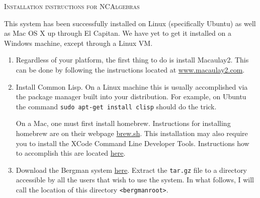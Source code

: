 \documentclass{article}
\newcommand{\bergroot}{\texttt{<bergmanroot>}}
\begin{document}
\begin{center}
\textsc{Installation instructions for NCAlgebras}
\end{center}

This system has been successfully installed on Linux (specifically Ubuntu)
as well as Mac OS X up through El Capitan.  We have yet to get it installed
on a Windows machine, except through a Linux VM.

\begin{enumerate}

\item Regardless of your platform, the first thing to do is install Macaulay2.
This can be done by following the instructions located at \url{www.macaulay2.com}.

\item Install Common Lisp.  On a Linux machine this is usually accomplished via
the package manager built into your distribution.  For example, on Ubuntu
the command \texttt{sudo apt-get install clisp} should do the trick.

On a Mac, one must first install homebrew.  Instructions for installing homebrew
are on their webpage \url{brew.sh}.  This installation may also require you to install
the XCode Command Line Developer Tools.  Instructions how to accomplish this are located
\href{http://osxdaily.com/2014/02/12/install-command-line-tools-mac-os-x/}{here}.

\item Download the Bergman system \href{http://servus.math.su.se/bergman/}{here}.
Extract the \texttt{tar.gz} file to a directory accessible by all the users that wish
to use the system.  In what follows, I will call the location of this directory \bergroot. 


\end{enumerate}
\end{document}
